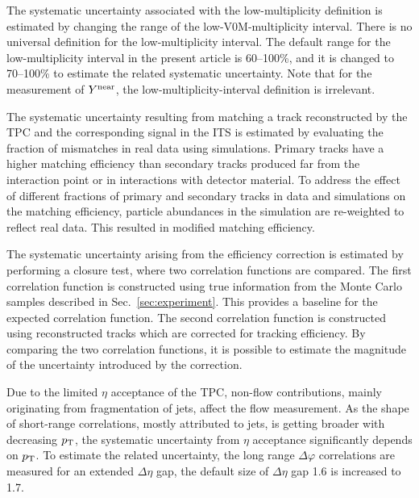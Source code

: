 The systematic uncertainty associated with the low-multiplicity definition is estimated by changing the range of the low-V0M-multiplicity interval. There is no universal definition for the low-multiplicity interval. The default range for the low-multiplicity interval in the present article is 60--100\%, and it is changed to 70--100\% to estimate the related systematic uncertainty. 
Note that for the measurement of $Y^{\rm{near}}$, the low-multiplicity-interval definition is irrelevant. 

The systematic uncertainty resulting from matching a track reconstructed by the TPC and the corresponding signal in the ITS is estimated by evaluating the fraction of mismatches in real data using simulations. Primary tracks have a higher matching efficiency than secondary tracks produced far from the interaction point or in interactions with detector material. To address the effect of different fractions of primary and secondary tracks in data and simulations on the matching efficiency, particle abundances in the simulation are re-weighted to reflect real data. This resulted in modified matching efficiency.

The systematic uncertainty arising from the efficiency correction is estimated by performing a closure test, where two correlation functions are compared. The first correlation function is constructed using true information from the Monte Carlo samples described in Sec.~\ref{sec:experiment}. This provides a baseline for the expected correlation function. The second correlation function is constructed using reconstructed tracks which are corrected for tracking efficiency. By comparing the two correlation functions, it is possible to estimate the magnitude of the uncertainty introduced by the correction. 

Due to the limited $\eta$ acceptance of the TPC, non-flow contributions, mainly originating from fragmentation of jets, affect the flow measurement. As the shape of short-range correlations, mostly attributed to jets, is getting broader with decreasing $p_\mathrm{T}$, the systematic uncertainty from $\eta$ acceptance significantly depends on $p_{\rm{T}}$. To estimate the related uncertainty, the long range $\Delta\varphi$ correlations are measured for an extended $\Delta\eta$ gap, the default size of $\Delta\eta$ gap 1.6 is increased to 1.7.

